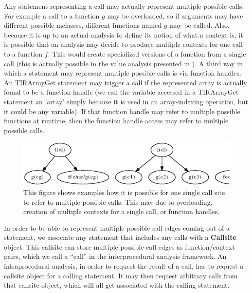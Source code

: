 Any statement representing a call may actually represent multiple
possible calls. For example a call to a function $g$ may be
overloaded, so if arguments may have different possible mclasses,
different functions named $g$ may be called. Also, because it is up to
an actual analysis to define its notion of what a context is, it is
possible that an analysis may decide to produce multiple contexts for
one call to a function $f$. This would create specialized versions of
a function from a single call (this is actually possible in the value
analysis presented in ).  A third way in
which a statement may represent multiple possible calls is via
function handles. An TIRArrayGet statement may trigger a call if the
represented array is actually found to be a function handle (we call
the variable accessed in a TIRArrayGet statement an 'array'
simply because it is used in an array-indexing operation, but it 
could be any variable). If that function handle may refer to multiple
possible functions at runtime, then the function handle access may
refer to multiple possible calls.

\begin{figure}[htbp]
\begin{center}
\includegraphics[scale=.5]{Figures/callsites.eps}
\caption[Multiple possible callsites from one statement]{
This figure shows examples how it is possible for one single call site
to refer to multiple possible calls. This may  due to overloading,
creation of multiple contexts for a single call, or function handles.
}
\label{Fig:callstring}
\end{center}
\end{figure}

In order to be able to represent multiple possible call edges coming
out of a statement, we associate any statement that includes any calls
with a \textbf{Callsite} object. This callsite can store multiple
possible call edges as function/context pairs, which we call a
``call'' in the interprocedural analysis framework.  An
intraprocedural analysis, in order to request the result of a call,
has to request a callsite object for a calling statement. It may then
request arbitrary calls from that callsite object, which will all
get associated with the calling statement.

